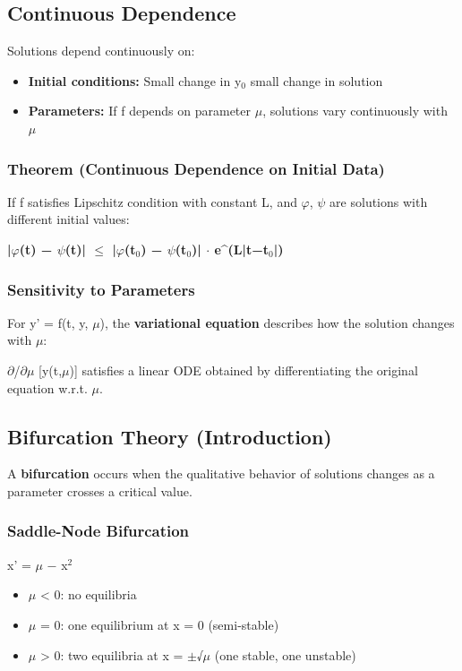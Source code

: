 \documentclass[12pt,a4paper,openany]{book}
\begin{document}
{{\subsection{Continuous Dependence}

Solutions depend continuously on:
\begin{itemize}
  \item \textbf{Initial conditions:} Small change in y$_0$  small change in solution
  \item \textbf{Parameters:} If f depends on parameter $\mu$, solutions vary continuously with $\mu$
\end{itemize}

\subsubsection{Theorem (Continuous Dependence on Initial Data)}
If f satisfies Lipschitz condition with constant L, and $\varphi$, $\psi$ are solutions with different initial values:

\textbf{|$\varphi$(t) − $\psi$(t)| $\leq$ |$\varphi$(t$_0$) − $\psi$(t$_0$)| $\cdot$ e^(L|t−t$_0$|)}

\subsubsection{Sensitivity to Parameters}
For y' = f(t, y, $\mu$), the \textbf{variational equation} describes how the solution changes with $\mu$:

$\partial$/$\partial\mu$ [y(t,$\mu$)] satisfies a linear ODE obtained by differentiating the original equation w.r.t. $\mu$.

\subsection{Bifurcation Theory (Introduction)}

A \textbf{bifurcation} occurs when the qualitative behavior of solutions changes as a parameter crosses a critical value.

\subsubsection{Saddle-Node Bifurcation}
x' = $\mu$ − x$^2$

\begin{itemize}[leftmargin=*]
  \item $\mu$ < 0: no equilibria
  \item $\mu$ = 0: one equilibrium at x = 0 (semi-stable)
  \item $\mu$ > 0: two equilibria at x = $\pm$√$\mu$ (one stable, one unstable)
\end{itemize}

}}
\end{document}
